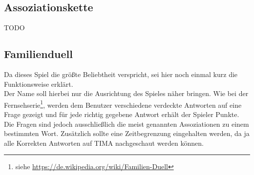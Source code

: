 \subsection*{Assoziationskette}
TODO

\subsection*{Familienduell}
Da dieses Spiel die größte Beliebtheit verspricht, sei hier noch einmal kurz
die Funktionsweise erklärt.\\
Der Name soll hierbei nur die Ausrichtung des Spieles näher bringen.
Wie bei der
Fernsehserie\footnote{siehe \url{https://de.wikipedia.org/wiki/Familien-Duell}},
werden dem Benutzer verschiedene verdeckte Antworten auf eine Frage gezeigt
und für jede richtig gegebene Antwort erhält der Spieler Punkte.
Die Fragen sind jedoch ausschließlich die meist genannten Assoziationen zu einem
bestimmten Wort. Zusätzlich sollte eine Zeitbegrenzung eingehalten werden, da ja
alle Korrekten Antworten auf TIMA nachgeschaut werden können.























